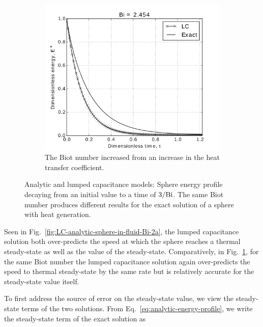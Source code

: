 \begin{figure}
        \begin{subfigure}[b]{0.65\textwidth}
                \includegraphics[width=\textwidth]{chapters/figures/LC-analytic-sphere-in-fluid-Bi-2b}
                \caption{The Biot number increased from  an increase in the heat transfer coefficient.}
				\label{fig:LC-analytic-sphere-in-fluid-Bi-2b}
        \end{subfigure}
        \caption[Analytic temperature profile for moderate Biot number]{Analytic and lumped capacitance models: Sphere energy profile decaying from an initial value to a time of $3/\mathrm{Bi}$. The same Biot number produces different results for the exact solution of a sphere with heat generation.}\label{fig:LC-analytic-sphere-in-fluid-Bi-2}
\end{figure}

Seen in Fig.~\ref{fig:LC-analytic-sphere-in-fluid-Bi-2a}, the lumped capacitance solution both over-predicts the speed at which the sphere reaches a thermal steady-state as well as the value of the steady-state. Comparatively, in Fig.~\ref{fig:LC-analytic-sphere-in-fluid-Bi-2b}, for the same Biot number the lumped capacitance solution again over-predicts the speed to thermal steady-state by the same rate but is relatively accurate for the steady-state value itself. 

To first address the source of error on the steady-state value, we view the steady-state terms of the two solutions. From Eq.~\ref{eq:analytic-energy-profile}, we write the steady-state term of the exact solution as 

